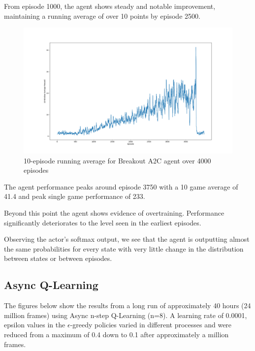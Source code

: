 \documentclass{article}
\begin{document}
From episode 1000, the agent shows steady and notable improvement, maintaining a running average of over 10 points by episode 2500.

\begin{figure}
\centering
\captionsetup{width=.8\linewidth}
\vspace*{-1cm}
\includegraphics[width=.98\linewidth]{A2C4000.png}
\caption{10-episode running average for Breakout A2C agent over 4000 episodes}
\end{figure}


 The agent performance peaks around episode 3750 with a 10 game average of 41.4 and peak single game performance of 233.

 Beyond this point the agent shows evidence of overtraining. Performance significantly deteriorates to the level seen in the earliest episodes.

 Observing the actor's softmax output, we see that the agent is outputting almost the same probabilities for every state with very little change in the distribution between states or between episodes.

\subsection{Async Q-Learning}

The figures below show the results from a long run of approximately 40 hours (24 million frames) using Async n-step Q-Learning (n=8). A learning rate of 0.0001, epsilon values in the $\epsilon$-greedy policies varied in different processes and were reduced from a maximum of 0.4 down to 0.1 after approximately a million frames.
\end{document}

